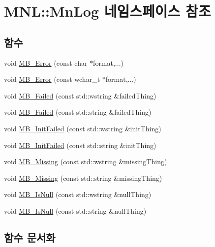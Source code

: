 \hypertarget{namespace_m_n_l_1_1_mn_log}{}\section{M\+NL\+:\+:Mn\+Log 네임스페이스 참조}
\label{namespace_m_n_l_1_1_mn_log}
\subsection*{함수}
\begin{DoxyCompactItemize}
\item 
void \hyperlink{namespace_m_n_l_1_1_mn_log_ac9a0d6428367f0937cb380a18e6bcaed}{M\+B\+\_\+\+Error} (const char $\ast$format,...)
\item 
void \hyperlink{namespace_m_n_l_1_1_mn_log_a991c653f770d7dcf1dba7bd2b665b769}{M\+B\+\_\+\+Error} (const wchar\+\_\+t $\ast$format,...)
\item 
void \hyperlink{namespace_m_n_l_1_1_mn_log_a4d03842c65201488edbb5a7da1320ac9}{M\+B\+\_\+\+Failed} (const std\+::wstring \&failed\+Thing)
\item 
void \hyperlink{namespace_m_n_l_1_1_mn_log_a364608e227a2171ea6f86ecb557735e2}{M\+B\+\_\+\+Failed} (const std\+::string \&failed\+Thing)
\item 
void \hyperlink{namespace_m_n_l_1_1_mn_log_aef654e043a712a8b54ab59049d43881c}{M\+B\+\_\+\+Init\+Failed} (const std\+::wstring \&init\+Thing)
\item 
void \hyperlink{namespace_m_n_l_1_1_mn_log_af2116ced6f18056ab8371affe24011d9}{M\+B\+\_\+\+Init\+Failed} (const std\+::string \&init\+Thing)
\item 
void \hyperlink{namespace_m_n_l_1_1_mn_log_aa4b3b0b3a1d53be57a16e07df8ba355b}{M\+B\+\_\+\+Missing} (const std\+::wstring \&missing\+Thing)
\item 
void \hyperlink{namespace_m_n_l_1_1_mn_log_aa33a76c4a666f9d43e4c86a0bb4e7337}{M\+B\+\_\+\+Missing} (const std\+::string \&missing\+Thing)
\item 
void \hyperlink{namespace_m_n_l_1_1_mn_log_a980ff7e858520fc4e4be3fb31fa3e0f2}{M\+B\+\_\+\+Is\+Null} (const std\+::wstring \&null\+Thing)
\item 
void \hyperlink{namespace_m_n_l_1_1_mn_log_a0bc5bf2479ea5d36919d57a6c4ec6caa}{M\+B\+\_\+\+Is\+Null} (const std\+::string \&null\+Thing)
\end{DoxyCompactItemize}


\subsection{함수 문서화}
\mbox{\label{namespace_m_n_l_1_1_mn_log_ac9a0d6428367f0937cb380a18e6bcaed}} 
